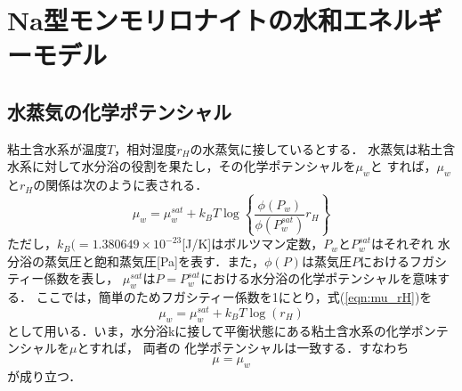 ﻿\section{Na型モンモリロナイトの水和エネルギーモデル}
\subsection{水蒸気の化学ポテンシャル}
粘土含水系が温度$T$，相対湿度$r_H$の水蒸気に接しているとする．
水蒸気は粘土含水系に対して水分浴の役割を果たし，その化学ポテンシャルを$\mu_w$と
すれば，$\mu_w$と$r_H$の関係は次のように表される．
\begin{equation}
	\mu_w
	=
	\mu_w^{sat} +k_BT \log
	\left\{
		\frac{\phi(P_w)}{\phi(P^{sat}_w)}
		r_H
	\right\}
	\label{eqn:mu_rH}
\end{equation}
ただし，$k_B(=1.380649\times 10^{−23}$[J/K]はボルツマン定数，$P_w$と$P^{sat}_w$はそれぞれ 
水分浴の蒸気圧と飽和蒸気圧[Pa]を表す．また，$\phi(P)$は蒸気圧$P$におけるフガシティー係数を表し，
$\mu_w^{sat}$は$P=P^{sat}_w$における水分浴の化学ポテンシャルを意味する．
ここでは，簡単のためフガシティー係数を1にとり，式(\ref{eqn:mu_rH})を
\begin{equation}
	\mu_w
	=
	\mu_w^{sat} +k_BT \log
	\left(
		r_H
	\right)
	\label{eqn:mu_rH_simple}
\end{equation}
として用いる．いま，水分浴kに接して平衡状態にある粘土含水系の化学ポンテンシャルを$\mu$とすれば，
両者の 化学ポテンシャルは一致する．すなわち
\begin{equation}
	\mu=\mu_{w}
	\label{eqn:equiv_mu}
\end{equation}
が成り立つ．
